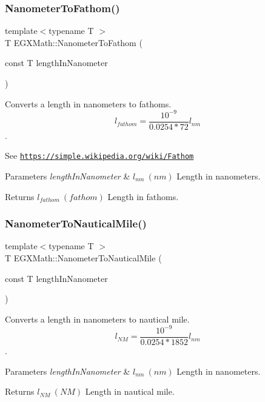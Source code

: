 \subsubsection{\texorpdfstring{Nanometer\+To\+Fathom()}{NanometerToFathom()}}
{\footnotesize\ttfamily template$<$typename T $>$ \\
T E\+G\+X\+Math\+::\+Nanometer\+To\+Fathom (\begin{DoxyParamCaption}\item[{const T}]{length\+In\+Nanometer }\end{DoxyParamCaption})}



Converts a length in nanometers to fathoms. \[ l_{fathom}= \frac{10^{-9}}{0.0254 * 72} l_{nm} \]. 

See \href{https://simple.wikipedia.org/wiki/Fathom}{\tt https\+://simple.\+wikipedia.\+org/wiki/\+Fathom} 
\begin{DoxyParams}{Parameters}
{\em length\+In\+Nanometer} & $ l_{nm}\ (nm)$ Length in nanometers. \\
\hline
\end{DoxyParams}
\begin{DoxyReturn}{Returns}
$ l_{fathom}\ (fathom)$ Length in fathoms. 
\end{DoxyReturn}
\mbox{\label{group___e_g_x_math-_conversions-_length_conversions-_s_i-_nanometer-_nautical_gac428c495bff87ba53c856395a7410fc3}} 
\subsubsection{\texorpdfstring{Nanometer\+To\+Nautical\+Mile()}{NanometerToNauticalMile()}}
{\footnotesize\ttfamily template$<$typename T $>$ \\
T E\+G\+X\+Math\+::\+Nanometer\+To\+Nautical\+Mile (\begin{DoxyParamCaption}\item[{const T}]{length\+In\+Nanometer }\end{DoxyParamCaption})}



Converts a length in nanometers to nautical mile. \[ l_{NM}= \frac{10^{-9}}{0.0254 * 1852} l_{nm} \]. 


\begin{DoxyParams}{Parameters}
{\em length\+In\+Nanometer} & $ l_{nm}\ (nm)$ Length in nanometers. \\
\hline
\end{DoxyParams}
\begin{DoxyReturn}{Returns}
$ l_{NM}\ (NM)$ Length in nautical mile. 
\end{DoxyReturn}
